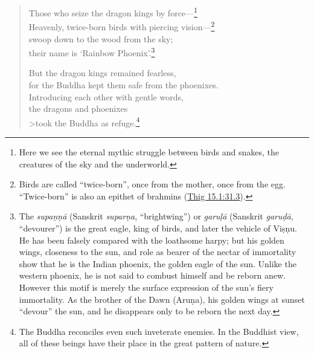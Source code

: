 \documentclass[12pt,openany]{book}%
\begin{document}
\begin{verse}
Those who seize the dragon kings by force—\footnote{Here we see the eternal mythic struggle between birds and snakes, the creatures of the sky and the underworld. } \\
Heavenly, twice-born birds with piercing vision—\footnote{Birds are called “twice-born”, once from the mother, once from the egg. “Twice-born” is also an epithet of brahmins (\href{https://suttacentral.net/thig15.1/en/sujato\#31.3}{Thig 15.1:31.3}). } \\
swoop down to the wood from the sky; \\
their name is ‘Rainbow Phoenix’.\footnote{The \textit{\textsanskrit{supaṇṇā}} (Sanskrit \textit{\textsanskrit{suparṇa}}, “brightwing”) or \textit{\textsanskrit{garuḷā}} (Sanskrit \textit{\textsanskrit{garuḍā}}, “devourer”) is the great eagle, king of birds, and later the vehicle of \textsanskrit{Viṣṇu}. He has been falsely compared with the loathsome harpy; but his golden wings, closeness to the sun, and role as bearer of the nectar of immortality show that he is the Indian phoenix, the golden eagle of the sun. Unlike the western phoenix, he is not said to combust himself and be reborn anew. However this motif is merely the surface expression of the sun’s fiery immortality. As the brother of the Dawn (\textsanskrit{Aruṇa}), his golden wings at sunset “devour” the sun, and he disappears only to be reborn the next day. } 

But the dragon kings remained fearless, \\
for the Buddha kept them safe from the phoenixes. \\
Introducing each other with gentle words, \\
the dragons and phoenixes \\>took the Buddha as refuge.\footnote{The Buddha reconciles even such inveterate enemies. In the Buddhist view, all of these beings have their place in the great pattern of nature. } 


\end{verse}
\end{document}
